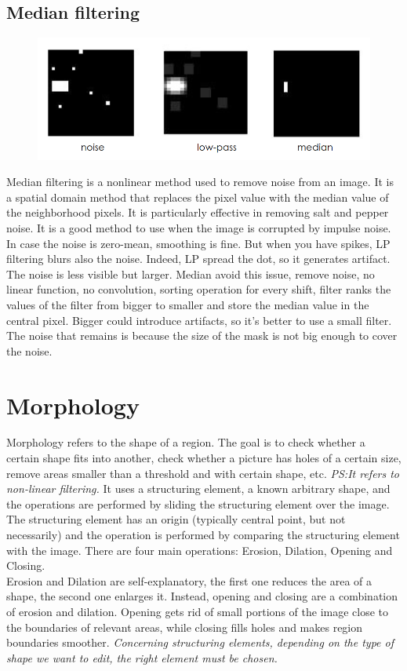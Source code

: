 \subsection{Median filtering}
\begin{figure}[h]
    \centering
    \includegraphics[scale=0.5]{Figures/Noise.png}
    \label{fig:enter-label}
\end{figure}
Median filtering is a nonlinear method used to remove noise from an image. It is a spatial domain method that replaces the pixel value with the median value of the neighborhood pixels. It is particularly effective in removing salt and pepper noise. It is a good method to use when the image is corrupted by impulse noise. 
In case the noise is zero-mean, smoothing is fine. But when you have spikes, LP filtering blurs also the noise.
Indeed, LP spread the dot, so it generates artifact. The noise is less visible but larger. Median avoid this issue, remove noise, no linear function, no convolution, sorting operation for every shift, filter ranks the values of the filter from bigger to smaller and store the median value in the central pixel. Bigger could introduce artifacts, so it's better to use a small filter. The noise that remains is because the size of the mask is not big enough to cover the noise.
\section{Morphology}
Morphology refers to the shape of a region. The goal is to check whether a certain shape fits into another, check whether a picture has holes of a certain size, remove areas smaller than a threshold and with certain shape, etc. 
\textit{PS:It refers to non-linear filtering.}
It uses a structuring element, a known arbitrary shape, and the operations are performed by sliding the structuring element over the image. The structuring element has an origin (typically central point, but not necessarily) and the operation is performed by comparing the structuring element with the image.
There are four main operations: Erosion, Dilation, Opening and Closing.\\
Erosion and Dilation are self-explanatory, the first one reduces the area of a shape, the second one enlarges it. Instead, opening and closing are a combination of erosion and dilation. Opening gets rid of small portions of the image close to the boundaries of relevant areas, while closing fills holes and makes region boundaries smoother. 
\textit{Concerning structuring elements, depending on the type of shape we want to edit, the right element must be chosen.}
